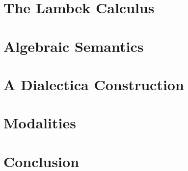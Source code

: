 \documentclass{article}
\begin{document}
\section{The Lambek Calculus}


\section{Algebraic Semantics}

\section{A Dialectica Construction}

\section{Modalities}
\section{Conclusion}




\end{document}
